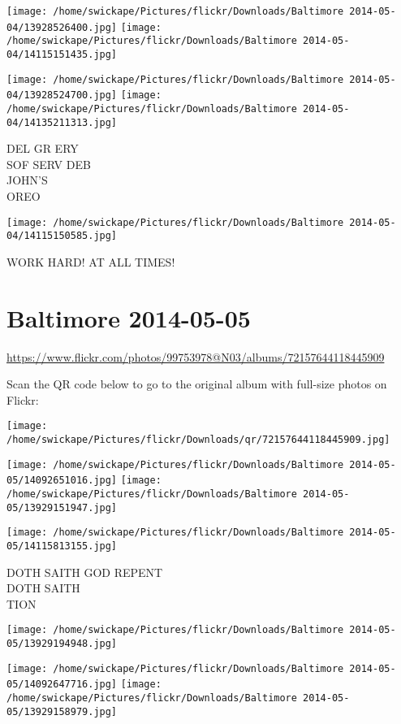 \documentclass[10pt,letterpaper]{article}
\begin{document}
\texttt{[image: /home/swickape/Pictures/flickr/Downloads/Baltimore 2014-05-04/13928526400.jpg]}
\texttt{[image: /home/swickape/Pictures/flickr/Downloads/Baltimore 2014-05-04/14115151435.jpg]}

\texttt{[image: /home/swickape/Pictures/flickr/Downloads/Baltimore 2014-05-04/13928524700.jpg]}
\texttt{[image: /home/swickape/Pictures/flickr/Downloads/Baltimore 2014-05-04/14135211313.jpg]}

DEL GR ERY\\
SOF SERV DEB\\
JOHN'S\\
OREO
\pagebreak

\texttt{[image: /home/swickape/Pictures/flickr/Downloads/Baltimore 2014-05-04/14115150585.jpg]}

WORK HARD!  AT ALL TIMES!
\pagebreak

\section*{Baltimore 2014-05-05}

\url{https://www.flickr.com/photos/99753978@N03/albums/72157644118445909}

Scan the QR code below to go to the original album with full-size photos on Flickr:

\texttt{[image: /home/swickape/Pictures/flickr/Downloads/qr/72157644118445909.jpg]}
\pagebreak

\texttt{[image: /home/swickape/Pictures/flickr/Downloads/Baltimore 2014-05-05/14092651016.jpg]}
\texttt{[image: /home/swickape/Pictures/flickr/Downloads/Baltimore 2014-05-05/13929151947.jpg]}

\texttt{[image: /home/swickape/Pictures/flickr/Downloads/Baltimore 2014-05-05/14115813155.jpg]}

DOTH SAITH GOD REPENT\\
DOTH SAITH\\
TION
\pagebreak

\texttt{[image: /home/swickape/Pictures/flickr/Downloads/Baltimore 2014-05-05/13929194948.jpg]}

\vspace{0.25in}
\texttt{[image: /home/swickape/Pictures/flickr/Downloads/Baltimore 2014-05-05/14092647716.jpg]}
\texttt{[image: /home/swickape/Pictures/flickr/Downloads/Baltimore 2014-05-05/13929158979.jpg]}
\end{document}
